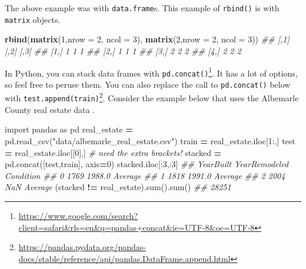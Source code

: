 \documentclass[12pt,krantz2]{krantz}
\makeatletter
\newenvironment{Shaded}{\begin{snugshade}}{\end{snugshade}}
\newcommand{\BuiltInTok}[1]{#1}
\newcommand{\CommentTok}[1]{\textcolor[rgb]{0.37,0.37,0.37}{\textit{#1}}}
\newcommand{\DataTypeTok}[1]{\textcolor[rgb]{0.27,0.27,0.27}{#1}}
\newcommand{\DecValTok}[1]{\textcolor[rgb]{0.06,0.06,0.06}{#1}}
\newcommand{\ImportTok}[1]{#1}
\newcommand{\KeywordTok}[1]{\textcolor[rgb]{0.27,0.27,0.27}{\textbf{#1}}}
\newcommand{\NormalTok}[1]{#1}
\newcommand{\OperatorTok}[1]{\textcolor[rgb]{0.43,0.43,0.43}{\textbf{#1}}}
\newcommand{\StringTok}[1]{\textcolor[rgb]{0.5,0.5,0.5}{#1}}
\renewcommand{\href}[2]{#2\footnote{\url{#1}}}
\newenvironment{kframe}{%
\medskip{}
\setlength{\fboxsep}{.8em}
 \def\at@end@of@kframe{}%
 \ifinner\ifhmode%
  \def\at@end@of@kframe{\end{minipage}}%
  \begin{minipage}{\columnwidth}%
 \fi\fi%
 \def\FrameCommand##1{\hskip\@totalleftmargin \hskip-\fboxsep
 \colorbox{shadecolor}{##1}\hskip-\fboxsep
     \hskip-\linewidth \hskip-\@totalleftmargin \hskip\columnwidth}%
 \MakeFramed {\advance\hsize-\width
   \@totalleftmargin\z@ \linewidth\hsize
   \@setminipage}}%
 {\par\unskip\endMakeFramed%
 \at@end@of@kframe}
\renewenvironment{Shaded}{\begin{kframe}}{\end{kframe}}
\makeatother
\begin{document}
The above example was with \texttt{data.frame}s. This example of \texttt{rbind()} is with \texttt{matrix} objects.

\begin{Shaded}
\begin{Highlighting}[]
\KeywordTok{rbind}\NormalTok{(}\KeywordTok{matrix}\NormalTok{(}\DecValTok{1}\NormalTok{,}\DataTypeTok{nrow =} \DecValTok{2}\NormalTok{, }\DataTypeTok{ncol =} \DecValTok{3}\NormalTok{), }
      \KeywordTok{matrix}\NormalTok{(}\DecValTok{2}\NormalTok{,}\DataTypeTok{nrow =} \DecValTok{2}\NormalTok{, }\DataTypeTok{ncol =} \DecValTok{3}\NormalTok{))}
\CommentTok{##      [,1] [,2] [,3]}
\CommentTok{## [1,]    1    1    1}
\CommentTok{## [2,]    1    1    1}
\CommentTok{## [3,]    2    2    2}
\CommentTok{## [4,]    2    2    2}
\end{Highlighting}
\end{Shaded}

In Python, you can stack data frames with \href{https://www.google.com/search?client=safari\&rls=en\&q=pandas+concat\&ie=UTF-8\&oe=UTF-8}{\texttt{pd.concat()}}. It has a lot of options, so feel free to peruse them. You can also replace the call to \texttt{pd.concat()} below with \href{https://pandas.pydata.org/pandas-docs/stable/reference/api/pandas.DataFrame.append.html}{\texttt{test.append(train)}}. Consider the example below that uses the Albemarle County real estate data \citep{albemarle_county_gis_web} \citep{clay_ford}.

\begin{Shaded}
\begin{Highlighting}[]
\ImportTok{import}\NormalTok{ pandas }\ImportTok{as}\NormalTok{ pd}
\NormalTok{real_estate }\OperatorTok{=}\NormalTok{ pd.read_csv(}\StringTok{"data/albemarle_real_estate.csv"}\NormalTok{)}
\NormalTok{train }\OperatorTok{=}\NormalTok{ real_estate.iloc[}\DecValTok{1}\NormalTok{:,]}
\NormalTok{test }\OperatorTok{=}\NormalTok{ real_estate.iloc[[}\DecValTok{0}\NormalTok{],] }\CommentTok{# need the extra brackets!}
\NormalTok{stacked }\OperatorTok{=}\NormalTok{ pd.concat([test,train], axis}\OperatorTok{=}\DecValTok{0}\NormalTok{)}
\NormalTok{stacked.iloc[:}\DecValTok{3}\NormalTok{,:}\DecValTok{3}\NormalTok{]}
\CommentTok{##    YearBuilt  YearRemodeled Condition}
\CommentTok{## 0       1769         1988.0   Average}
\CommentTok{## 1       1818         1991.0   Average}
\CommentTok{## 2       2004            NaN   Average}
\NormalTok{(stacked }\OperatorTok{!=}\NormalTok{ real_estate).}\BuiltInTok{sum}\NormalTok{().}\BuiltInTok{sum}\NormalTok{()}
\CommentTok{## 28251}
\end{Highlighting}
\end{Shaded}
\end{document}
